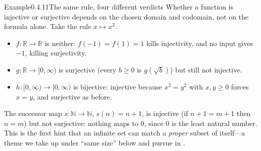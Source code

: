 \documentclass[main.tex]{subfiles}
\begin{document}
\begin{ObjL}{Example}{0.4.11}{The same rule, four different verdicts}
Whether a function is injective or surjective depends on the chosen domain and codomain, not on the
formula alone. Take the rule $x\mapsto x^2$.
\begin{itemize}
  \item $f\colon\mathbb R\to\mathbb R$ is neither: $f(-1)=f(1)=1$ kills injectivity, and no input
        gives $-1$, killing surjectivity.
  \item $g\colon\mathbb R\to[0,\infty)$ is surjective (every $b\ge 0$ is $g(\sqrt b)$) but still not
        injective.
  \item $h\colon[0,\infty)\to[0,\infty)$ is bijective: injective because $x^2=y^2$ with
        $x,y\ge 0$ forces $x=y$, and surjective as before.
\end{itemize}
The successor map $s\colon\mathbb N\to\mathbb N$, $s(n)=n+1$, is injective (if $n+1=m+1$ then $n=m$)
but not surjective: nothing maps to $0$, since $0$ is the least natural number. This is the first hint
that an infinite set can match a \emph{proper} subset of itself---a theme we take up under
``same size'' below and pursue in .
\end{ObjL}
\end{document}
